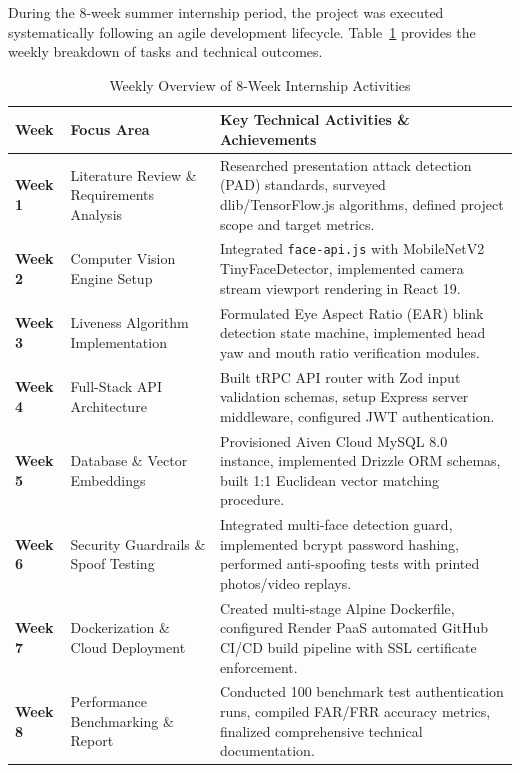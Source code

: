 \documentclass[12pt,a4paper,oneside]{article}
\begin{document}
During the 8-week summer internship period, the project was executed systematically following an agile development lifecycle. Table~\ref{tab:weekly_summary} provides the weekly breakdown of tasks and technical outcomes.

\begin{table}[h!]
\centering
\renewcommand{\arraystretch}{1.3}
\caption{Weekly Overview of 8-Week Internship Activities}
\label{tab:weekly_summary}
\small
\begin{tabular}{|p{1.5cm}|p{4.2cm}|p{9.0cm}|}
\hline
\rowcolor{gray!15} \textbf{Week} & \textbf{Focus Area} & \textbf{Key Technical Activities \& Achievements} \\ \hline
\textbf{Week 1} & Literature Review \& Requirements Analysis & Researched presentation attack detection (PAD) standards, surveyed dlib/TensorFlow.js algorithms, defined project scope and target metrics. \\ \hline
\textbf{Week 2} & Computer Vision Engine Setup & Integrated \texttt{face-api.js} with MobileNetV2 TinyFaceDetector, implemented camera stream viewport rendering in React 19. \\ \hline
\textbf{Week 3} & Liveness Algorithm Implementation & Formulated Eye Aspect Ratio (EAR) blink detection state machine, implemented head yaw and mouth ratio verification modules. \\ \hline
\textbf{Week 4} & Full-Stack API Architecture & Built tRPC API router with Zod input validation schemas, setup Express server middleware, configured JWT authentication. \\ \hline
\textbf{Week 5} & Database \& Vector Embeddings & Provisioned Aiven Cloud MySQL 8.0 instance, implemented Drizzle ORM schemas, built 1:1 Euclidean vector matching procedure. \\ \hline
\textbf{Week 6} & Security Guardrails \& Spoof Testing & Integrated multi-face detection guard, implemented bcrypt password hashing, performed anti-spoofing tests with printed photos/video replays. \\ \hline
\textbf{Week 7} & Dockerization \& Cloud Deployment & Created multi-stage Alpine Dockerfile, configured Render PaaS automated GitHub CI/CD build pipeline with SSL certificate enforcement. \\ \hline
\textbf{Week 8} & Performance Benchmarking \& Report & Conducted 100 benchmark test authentication runs, compiled FAR/FRR accuracy metrics, finalized comprehensive technical documentation. \\ \hline
\end{tabular}
\end{table}
\end{document}
